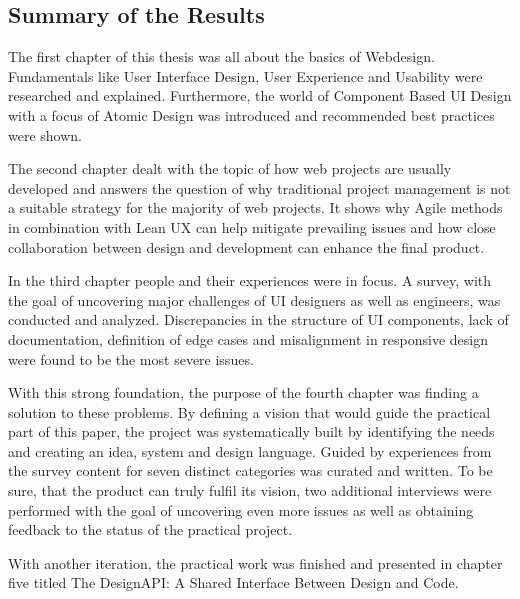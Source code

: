 \newpage
\subsection{Summary of the Results}
The first chapter of this thesis was all about the basics of Webdesign. Fundamentals like User
Interface Design, User Experience and Usability were researched and explained. Furthermore, the
world of Component Based UI Design with a focus of Atomic Design was introduced and recommended best
practices were shown.

The second chapter dealt with the topic of how web projects are usually developed and answers the
question of why traditional project management is not a suitable strategy for the majority of
web projects. It shows why Agile methods in combination with Lean UX can help mitigate prevailing
issues and how close collaboration between design and development can enhance the final product. 

In the third chapter people and their experiences were in focus. A survey, with the goal of
uncovering major challenges of UI designers as well as engineers, was conducted and analyzed.
Discrepancies in the structure of UI components, lack of documentation, definition of edge cases and
misalignment in responsive design were found to be the most severe issues.

With this strong foundation, the purpose of the fourth chapter was finding a solution to these
problems. By defining a vision that would guide the practical part of this paper, the project was
systematically built by identifying the needs and creating an idea, system and design language.
Guided by experiences from the survey content for seven distinct categories was curated and written.
To be sure, that the product can truly fulfil its vision, two additional interviews were performed
with the goal of uncovering even more issues as well as obtaining feedback to the status of the
practical project. 

With another iteration, the practical work was finished and presented in chapter five titled The
DesignAPI: A Shared Interface Between Design and Code. 